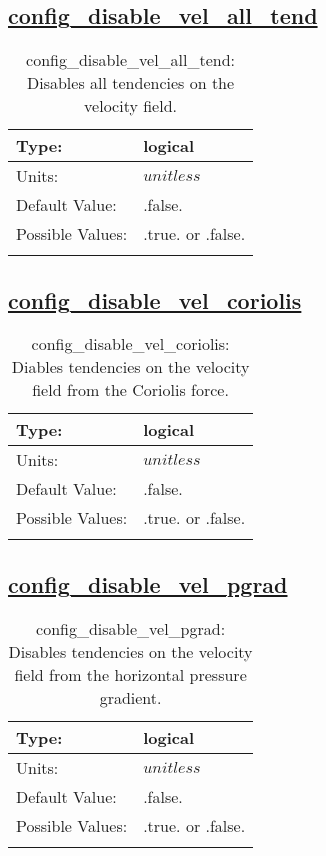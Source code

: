 \subsection[config\_disable\_vel\_all\_tend]{\hyperref[sec:nm_tab_debug]{config\_disable\_vel\_all\_tend}}
\label{subsec:nm_sec_config_disable_vel_all_tend}
\begin{center}
\begin{longtable}{| p{2.0in} || p{4.0in} |}
    \hline
    Type: & logical \\
    \hline
    Units: & $unitless$ \\
    \hline
    Default Value: & .false. \\
    \hline
    Possible Values: & .true. or .false. \\
    \hline
    \caption{config\_disable\_vel\_all\_tend: Disables all tendencies on the velocity field.}
\end{longtable}
\end{center}
\subsection[config\_disable\_vel\_coriolis]{\hyperref[sec:nm_tab_debug]{config\_disable\_vel\_coriolis}}
\label{subsec:nm_sec_config_disable_vel_coriolis}
\begin{center}
\begin{longtable}{| p{2.0in} || p{4.0in} |}
    \hline
    Type: & logical \\
    \hline
    Units: & $unitless$ \\
    \hline
    Default Value: & .false. \\
    \hline
    Possible Values: & .true. or .false. \\
    \hline
    \caption{config\_disable\_vel\_coriolis: Diables tendencies on the velocity field from the Coriolis force.}
\end{longtable}
\end{center}
\subsection[config\_disable\_vel\_pgrad]{\hyperref[sec:nm_tab_debug]{config\_disable\_vel\_pgrad}}
\label{subsec:nm_sec_config_disable_vel_pgrad}
\begin{center}
\begin{longtable}{| p{2.0in} || p{4.0in} |}
    \hline
    Type: & logical \\
    \hline
    Units: & $unitless$ \\
    \hline
    Default Value: & .false. \\
    \hline
    Possible Values: & .true. or .false. \\
    \hline
    \caption{config\_disable\_vel\_pgrad: Disables tendencies on the velocity field from the horizontal pressure gradient.}
\end{longtable}
\end{center}
